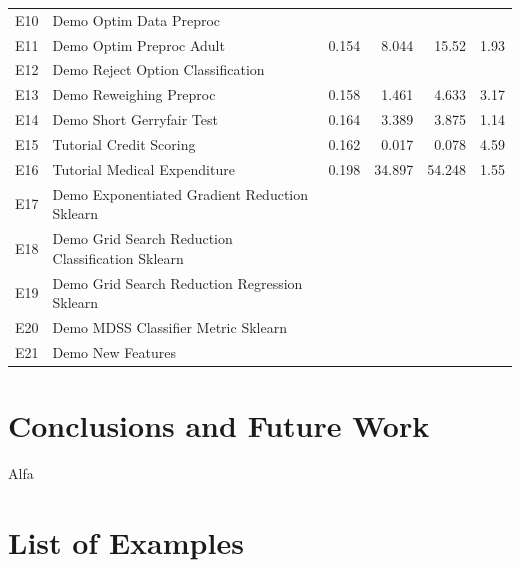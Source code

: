 \documentclass[sigconf,review]{acmart}
\begin{document}
\begin{table}[]
\begin{tabular}{clrrrr}
		E10 & Demo Optim Data Preproc                           &       &        &        &      \\
		E11 & Demo Optim Preproc Adult                          & 0.154 & 8.044  & 15.52  & 1.93 \\
		E12 & Demo Reject Option Classification                 &       &        &        &      \\
		E13 & Demo Reweighing Preproc                           & 0.158 & 1.461  & 4.633  & 3.17 \\
		E14 & Demo Short Gerryfair Test                         & 0.164 & 3.389  & 3.875  & 1.14 \\
		E15 & Tutorial Credit Scoring                           & 0.162 & 0.017  & 0.078  & 4.59 \\
		E16 & Tutorial Medical Expenditure                      & 0.198 & 34.897 & 54.248 & 1.55 \\
		E17 & Demo Exponentiated Gradient Reduction Sklearn     &       &        &        &      \\
		E18 & Demo Grid Search Reduction Classification Sklearn &       &        &        &      \\
		E19 & Demo Grid Search Reduction Regression Sklearn     &       &        &        &      \\
		E20 & Demo MDSS Classifier Metric Sklearn               &       &        &        &      \\
		E21 & Demo New Features                                 &       &        &        &      \\ \hline
	\end{tabular}
\end{table}



\section{Conclusions and Future Work}
\label{sec:conclusions_and_future_work}

Alfa \cite{cormen2009introduction}

\appendix

\section{List of Examples}
\label{sec:list_of_examples}
\end{document}
